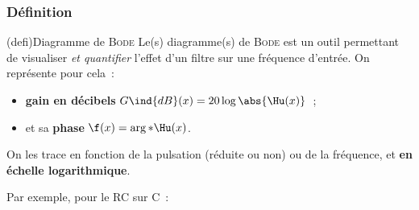 \documentclass[../../main/main.tex]{subfiles}
\begin{document}
\subsubsection{Définition}
\begin{tcb*}(defi){Diagramme de \textsc{Bode}}
	Le(s) diagramme(s) de \textsc{Bode} est un outil permettant de visualiser
	\textit{et quantifier} l'effet d'un filtre sur une fréquence d'entrée. On
	représente pour cela~:
	\begin{itemize}
		\item \textbf{gain en décibels} $G\ind{dB}(x) = 20 \log \abs{\Hu(x)}$~;
		\item et sa \textbf{phase} $\f(x) = \arg*{{\Hu(x}})$.
	\end{itemize}
	\smallbreak
	On les trace en fonction de la pulsation (réduite ou non) ou de la fréquence,
	et \textbf{en échelle logarithmique}.
\end{tcb*}
Par exemple, pour le RC sur C~:
\end{document}
